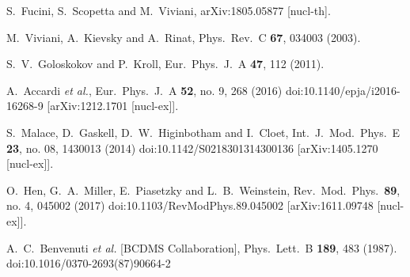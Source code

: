 \documentclass[twocolumn]{revtex4}
\begin{document}
\begin{thebibliography}{25}
  S.~Fucini, S.~Scopetta and M.~Viviani,
  arXiv:1805.05877 [nucl-th].

  M.~Viviani, A.~Kievsky and A.~Rinat,
  Phys.\ Rev.\ C {\bf 67}, 034003 (2003).

  S.~V.~Goloskokov and P.~Kroll,
  Eur.\ Phys.\ J.\ A {\bf 47}, 112 (2011).

  A.~Accardi {\it et al.},
  Eur.\ Phys.\ J.\ A {\bf 52}, no. 9, 268 (2016)
  doi:10.1140/epja/i2016-16268-9
  [arXiv:1212.1701 [nucl-ex]].



  S.~Malace, D.~Gaskell, D.~W.~Higinbotham and I.~Cloet,
  Int.\ J.\ Mod.\ Phys.\ E {\bf 23}, no. 08, 1430013 (2014)
  doi:10.1142/S0218301314300136
  [arXiv:1405.1270 [nucl-ex]].
  
  O.~Hen, G.~A.~Miller, E.~Piasetzky and L.~B.~Weinstein,
  Rev.\ Mod.\ Phys.\  {\bf 89}, no. 4, 045002 (2017)
  doi:10.1103/RevModPhys.89.045002
  [arXiv:1611.09748 [nucl-ex]].

  A.~C.~Benvenuti {\it et al.} [BCDMS Collaboration],
  Phys.\ Lett.\ B {\bf 189}, 483 (1987).
  doi:10.1016/0370-2693(87)90664-2


\end{thebibliography}
\end{document}

